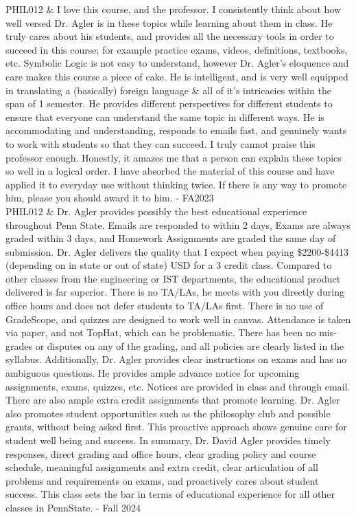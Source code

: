 \documentclass[p1noheader, 11pt]{../lightcv}
\begin{document}
\begin{dated}
    PHIL012 & I love this course, and the professor. I consistently think about how well versed Dr. Agler is in these topics while learning about them in class. He truly cares about his students, and provides all the necessary tools in order to succeed in this course; for example practice exams, videos, definitions, textbooks, etc. Symbolic Logic is not easy to understand, however Dr. Agler's eloquence and care makes this course a piece of cake. He is intelligent, and is very well equipped in translating a (basically) foreign language \& all of it's intricacies within the span of 1 semester. He provides different perspectives for different students to ensure that everyone can understand the same topic in different ways. He is accommodating and understanding, responds to emails fast, and genuinely wants to work with students so that they can succeed. I truly cannot praise this professor enough. Honestly, it amazes me that a person can explain these topics so well in a logical order. I have absorbed the material of this course and have applied it to everyday use without thinking twice. If there is any way to promote him, please you should award it to him. - FA2023\\
    PHIL012 & Dr. Agler provides possibly the best educational experience throughout Penn State. Emails are responded to within 2 days, Exams are always graded within 3 days, and Homework Assignments are graded the same day of submission. Dr. Agler delivers the quality that I expect when paying \$2200-\$4413 (depending on in state or out of state) USD for a 3 credit class. Compared to other classes from the engineering or IST departments, the educational product delivered is far superior. There is no TA/LAs, he meets with you directly during office hours and does not defer students to TA/LAs first. There is no use of GradeScope, and quizzes are designed to work well in canvas. Attendance is taken via paper, and not TopHat, which can be problematic. There has been no mis-grades or disputes on any of the grading, and all policies are clearly listed in the syllabus. Additionally, Dr. Agler provides clear instructions on exams and has no ambiguous questions. He provides ample advance notice for upcoming assignments, exams, quizzes, etc. Notices are provided in class and through email. There are also ample extra credit assignments that promote learning. Dr. Agler also promotes student opportunities such as the philosophy club and possible grants, without being asked first. This proactive approach shows genuine care for student well being and success. In summary, Dr. David Agler provides timely responses, direct grading and office hours, clear grading policy and course schedule, meaningful assignments and extra credit, clear articulation of all problems and requirements on exams, and proactively cares about student success. This class sets the bar in terms of educational experience for all other classes in PennState. - Fall 2024\\

\end{dated}
\end{document}
